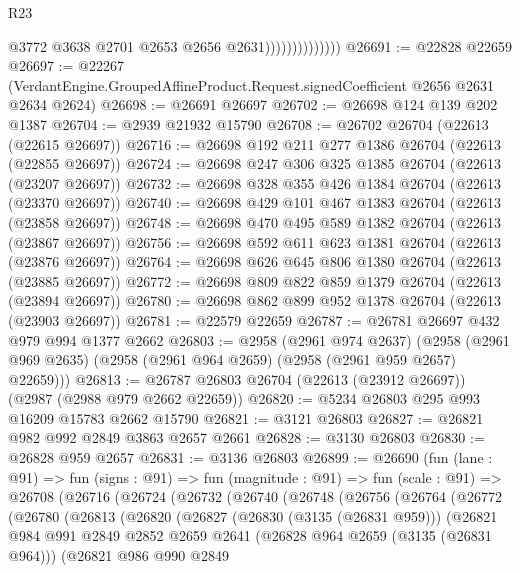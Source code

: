 \begin{lexlean}{R23}
\begin{coremodule}
                                @3772
                                @3638
                                @2701
                                @2653
                                @2656
                                @2631))))))))))))))
@26691 := @22828 @22659
@26697 := @22267
    (VerdantEngine.GroupedAffineProduct.Request.signedCoefficient @2656 @2631 @2634 @2624)
@26698 := @26691 @26697
@26702 := @26698 @124 @139 @202 @1387
@26704 := @2939 @21932 @15790
@26708 := @26702 @26704 (@22613 (@22615 @26697))
@26716 := @26698 @192 @211 @277 @1386 @26704 (@22613 (@22855 @26697))
@26724 := @26698 @247 @306 @325 @1385 @26704 (@22613 (@23207 @26697))
@26732 := @26698 @328 @355 @426 @1384 @26704 (@22613 (@23370 @26697))
@26740 := @26698 @429 @101 @467 @1383 @26704 (@22613 (@23858 @26697))
@26748 := @26698 @470 @495 @589 @1382 @26704 (@22613 (@23867 @26697))
@26756 := @26698 @592 @611 @623 @1381 @26704 (@22613 (@23876 @26697))
@26764 := @26698 @626 @645 @806 @1380 @26704 (@22613 (@23885 @26697))
@26772 := @26698 @809 @822 @859 @1379 @26704 (@22613 (@23894 @26697))
@26780 := @26698 @862 @899 @952 @1378 @26704 (@22613 (@23903 @26697))
@26781 := @22579 @22659
@26787 := @26781 @26697 @432 @979 @994 @1377 @2662
@26803 := @2958
    (@2961 @974 @2637)
    (@2958 (@2961 @969 @2635) (@2958 (@2961 @964 @2659) (@2958 (@2961 @959 @2657) @22659)))
@26813 := @26787 @26803 @26704 (@22613 (@23912 @26697)) (@2987 (@2988 @979 @2662 @22659))
@26820 := @5234 @26803 @295 @993 @16209 @15783 @2662 @15790
@26821 := @3121 @26803
@26827 := @26821 @982 @992 @2849 @3863 @2657 @2661
@26828 := @3130 @26803
@26830 := @26828 @959 @2657
@26831 := @3136 @26803
@26899 := @26690
    (fun (lane : @91) =>
    fun (signs : @91) =>
    fun (magnitude : @91) =>
    fun (scale : @91) =>
    @26708
      (@26716
        (@26724
          (@26732
            (@26740
              (@26748
                (@26756
                  (@26764
                    (@26772
                      (@26780
                        (@26813
                          (@26820
                            (@26827
                              (@26830 (@3135 (@26831 @959)))
                              (@26821
                                @984
                                @991
                                @2849
                                @2852
                                @2659
                                @2641
                                (@26828 @964 @2659 (@3135 (@26831 @964)))
                                (@26821
                                  @986
                                  @990
                                  @2849

\end{coremodule}
\end{lexlean}
